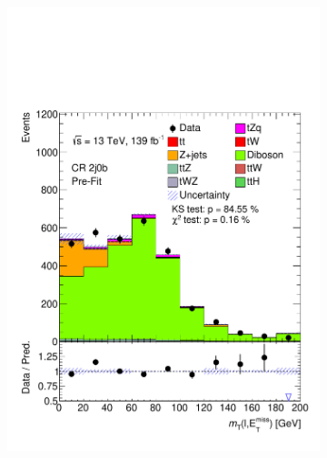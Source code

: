 \begin{figure}[h!] 
  \begin{subfigure}[b]{0.33\linewidth}
    \centering
    \includegraphics[width=\linewidth]{ubonn-thesis/Chapters/Chapters_05/Figure/CR_VV/CR_2j0b_mtW.pdf} 
  \end{subfigure} 
  \begin{subfigure}[b]{0.33\linewidth}
    \centering

\end{subfigure}
\end{figure}
